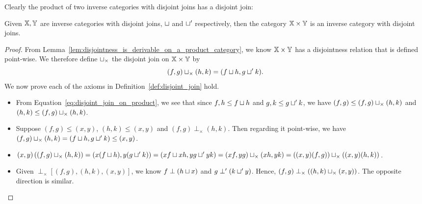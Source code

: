 Clearly the product of two inverse categories with disjoint joins has a disjoint join:
\begin{lemma}\label{lem:disjoint_join_is_in_product_category}
  Given $\mathbb{X}, \mathbb{Y}$ are inverse categories with disjoint joins, $\sqcup$ and $\sqcup'$ respectively,
  then the category $\mathbb{X} \times \mathbb{Y}$ is an inverse category with disjoint joins.
\end{lemma}
\begin{proof}
  From Lemma~\ref{lem:disjointness_is_derivable_on_a_product_category}, we know $\mathbb{X}\times\mathbb{Y}$ has a
  disjointness relation that is defined point-wise.  We therefore define $\sqcup_{\times}$ the
  disjoint join on $\mathbb{X}\times\mathbb{Y}$ by
  \begin{equation}
    (f,g)\sqcup_{\times}(h,k) = (f \sqcup h, g \sqcup' k). \label{eq:disjoint_join_on_product}
  \end{equation}
  We now prove each of the axioms in Definition~\ref{def:disjoint_join} hold.
  \begin{itemize}
    \item [\axiom{DJ}{1}] From Equation~\ref{eq:disjoint_join_on_product}, we see that since
      $f,h \le f \sqcup h$ and $g,k \le g \sqcup' k$, we have $(f,g) \le (f,g)\sqcup_{\times}(h,k)$
      and  $(h,k) \le (f,g)\sqcup_{\times}(h,k)$.
    \item [\axiom{DJ}{2}] Suppose $(f,g) \le (x,y)$, $(h,k) \le (x,y)$ and $(f,g) \perp_{\times}
      (h,k)$. Then regarding it point-wise, we have $(f,g)\sqcup_{\times}(h,k) = (f \sqcup h, g
      \sqcup' k) \le (x,y)$.
    \item [\axiom{DJ}{3}] $(x,y)\left((f,g)\sqcup_{\times}(h,k)\right) = (x(f \sqcup h), y(g
      \sqcup' k)) = (x f \sqcup x h, y g \sqcup' y k) = (x f,y g)\sqcup_{\times}(x h,y k) =
      ((x,y)(f,g))\sqcup_{\times}((x,y)(h,k))$.
    \item [\axiom{DJ}{4}] Given $\perp_{\times}\!\![(f,g),(h,k),(x,y)]$, we know $f \perp (h\sqcup
      x)$ and $g \perp' (k\sqcup' y)$. Hence, $(f,g) \perp_{\times}((h,k)\sqcup_{\times}(x,y))$. The
      opposite direction is similar.
  \end{itemize}
\end{proof}

